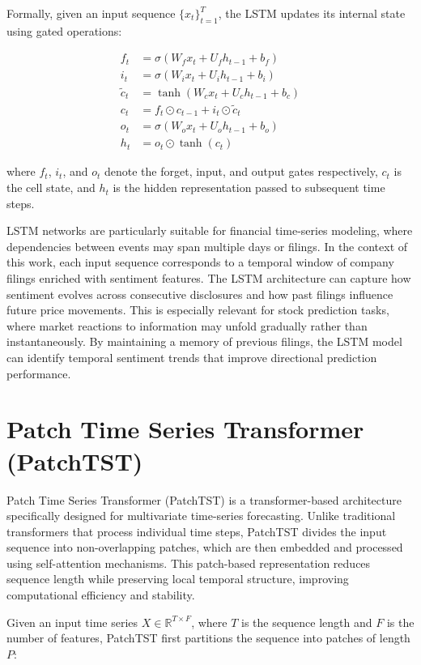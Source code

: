 Formally, given an input sequence $\{x_t\}_{t=1}^{T}$, the LSTM updates its internal state using gated operations:

\begin{align}
f_t &= \sigma(W_f x_t + U_f h_{t-1} + b_f) \\
i_t &= \sigma(W_i x_t + U_i h_{t-1} + b_i) \\
\tilde{c}_t &= \tanh(W_c x_t + U_c h_{t-1} + b_c) \\
c_t &= f_t \odot c_{t-1} + i_t \odot \tilde{c}_t \\
o_t &= \sigma(W_o x_t + U_o h_{t-1} + b_o) \\
h_t &= o_t \odot \tanh(c_t)
\end{align}

where $f_t$, $i_t$, and $o_t$ denote the forget, input, and output gates respectively, $c_t$ is the cell state, and $h_t$ is the hidden representation passed to subsequent time steps.

LSTM networks are particularly suitable for financial time-series modeling, where dependencies between events may span multiple days or filings. In the context of this work, each input sequence corresponds to a temporal window of company filings enriched with sentiment features. The LSTM architecture can capture how sentiment evolves across consecutive disclosures and how past filings influence future price movements. This is especially relevant for stock prediction tasks, where market reactions to information may unfold gradually rather than instantaneously. By maintaining a memory of previous filings, the LSTM model can identify temporal sentiment trends that improve directional prediction performance.

\section{Patch Time Series Transformer (PatchTST)}

Patch Time Series Transformer (PatchTST)\cite{nie2023timeseriesworth64} is a transformer-based architecture specifically designed for multivariate time-series forecasting. Unlike traditional transformers that process individual time steps, PatchTST divides the input sequence into non-overlapping patches, which are then embedded and processed using self-attention mechanisms. This patch-based representation reduces sequence length while preserving local temporal structure, improving computational efficiency and stability.

Given an input time series $X \in \mathbb{R}^{T \times F}$, where $T$ is the sequence length and $F$ is the number of features, PatchTST first partitions the sequence into patches of length $P$:

